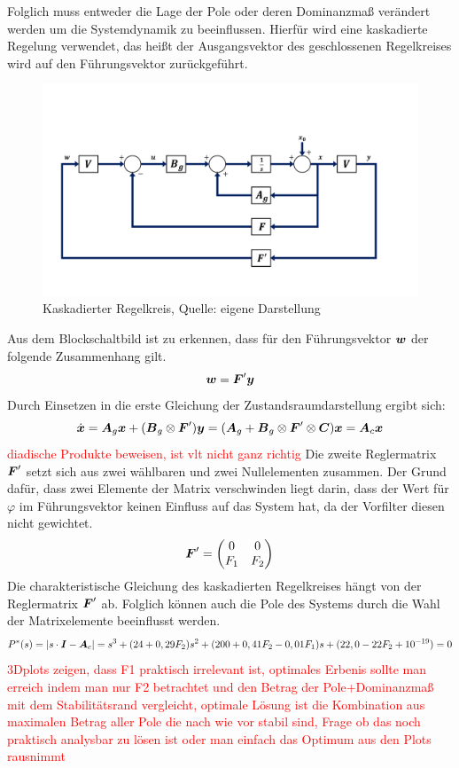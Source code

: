 Folglich muss entweder die Lage der Pole oder deren Dominanzmaß verändert werden um die Systemdynamik zu beeinflussen. Hierfür wird eine kaskadierte Regelung verwendet, das heißt der Ausgangsvektor des geschlossenen Regelkreises wird auf den Führungsvektor zurückgeführt.
\begin{figure}[!h]
\centering
\includegraphics[width=0.9\linewidth,trim={0cm 2cm 2cm 4.5cm}, clip]{4_Regelungstechnik/img/GRK_2}
\caption{Kaskadierter Regelkreis, Quelle: eigene Darstellung}
\end{figure}
Aus dem Blockschaltbild ist zu erkennen, dass für den Führungsvektor $\boldsymbol{w}$ der folgende Zusammenhang gilt.
\begin{equation}
\boldsymbol{w}=\boldsymbol{F}'\boldsymbol{y}
\end{equation}
Durch Einsetzen in die erste Gleichung der Zustandsraumdarstellung ergibt sich:
\begin{equation}
\dot{\boldsymbol{x}}=\boldsymbol{A}_g\boldsymbol{x}+(\boldsymbol{B}_g\otimes\boldsymbol{F}')\boldsymbol{y} = (\boldsymbol{A}_g+\boldsymbol{B}_g\otimes\boldsymbol{F}'\otimes\boldsymbol{C})\boldsymbol{x} = \boldsymbol{A}_c\boldsymbol{x}
\end{equation}\textcolor{red}{diadische Produkte beweisen, ist vlt nicht ganz richtig}
Die zweite Reglermatrix $\boldsymbol{F}'$ setzt sich aus zwei wählbaren und zwei Nullelementen zusammen. Der Grund dafür, dass zwei Elemente der Matrix verschwinden liegt darin, dass der Wert für $\varphi$ im Führungsvektor keinen Einfluss auf das System hat, da der Vorfilter diesen nicht gewichtet.
\begin{equation}
\boldsymbol{F}'=\begin{pmatrix}
0 & 0 \\ F_1 & F_2
\end{pmatrix}
\end{equation}
Die charakteristische Gleichung des kaskadierten Regelkreises hängt von der Reglermatrix $\boldsymbol{F}'$ ab. Folglich können auch die Pole des Systems durch die Wahl der Matrixelemente beeinflusst werden.
\begin{equation}
P^*(s) = |s\cdot\boldsymbol{I}-\boldsymbol{A}_c| = s^3+(24+0,29F_2)s^2+(200+0,41F_2-0,01F_1)s+(22,0-22F_2+10^{-19}) = 0
\end{equation}
\newpage
\textcolor{red}{3Dplots zeigen, dass F1 praktisch irrelevant ist, optimales Erbenis sollte man erreich indem man nur F2 betrachtet und den Betrag der Pole+Dominanzmaß mit dem Stabilitätsrand vergleicht, optimale Lösung ist die Kombination aus maximalen Betrag aller Pole die nach wie vor stabil sind, Frage ob das noch praktisch analysbar zu lösen ist oder man einfach das Optimum aus den Plots rausnimmt}

